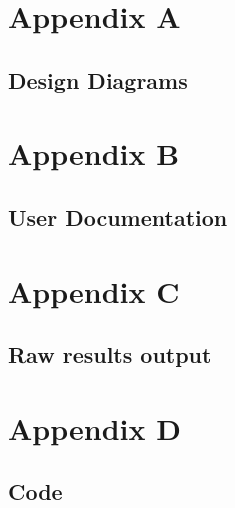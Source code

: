 \section{Appendix A}\label{appendix-a}

\subsection{Design Diagrams}\label{design-diagrams}

\section{Appendix B}\label{appendix-b}

\subsection{User Documentation}\label{user-documentation}

\section{Appendix C}\label{appendix-c}

\subsection{Raw results output}\label{raw-results-output}

\section{Appendix D}\label{appendix-d}

\subsection{Code}\label{code}
